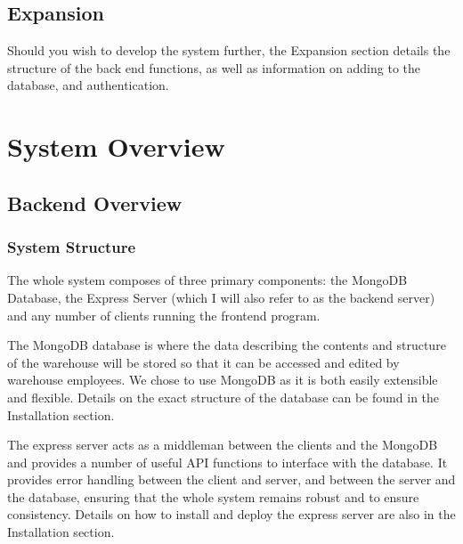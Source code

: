 \documentclass[letterpaper,10pt,english]{sphinxmanual}
\let\oldsubsection\subsection
\renewcommand{\subsection}{\needspace{6\baselineskip}\oldsubsection}
\begin{document}
\section{Expansion}
\label{\detokenize{Introduction:expansion}}
\begin{DUlineblock}{0em}
\item[] Should you wish to develop the system further, the Expansion section
details the structure of the back end functions, as well as
information on adding to the database, and authentication.
\item[] 
\end{DUlineblock}


\chapter{System Overview}
\label{\detokenize{index:system-overview}}

\section{Backend Overview}
\label{\detokenize{docs/System_Overview/Backend_overview:backend-overview}}\label{\detokenize{docs/System_Overview/Backend_overview::doc}}

\subsection{System Structure}
\label{\detokenize{docs/System_Overview/Backend_overview:system-structure}}
The whole system composes of three primary components: the MongoDB
Database, the Express Server (which I will also refer to as the back\sphinxhyphen{}end
server) and any number of clients running the front\sphinxhyphen{}end program.

The MongoDB database is where the data describing the contents and
structure of the warehouse will be stored so that it can be accessed and
edited by warehouse employees. We chose to use MongoDB as it is both
easily extensible and flexible. Details on the exact structure of the
database can be found in the Installation section.

The express server acts as a middle\sphinxhyphen{}man between the clients and the
MongoDB and provides a number of useful API functions to interface with
the database. It provides error handling between the client and server,
and between the server and the database, ensuring that the whole system
remains robust and to ensure consistency. Details on how to install and
deploy the express server are also in the Installation section.
\end{document}
